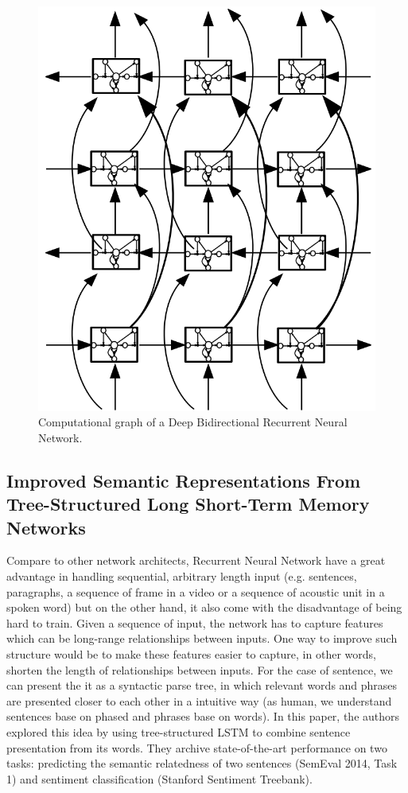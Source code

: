 \begin{figure}[H]
	\centering
	\includegraphics[scale=0.4]{figure/dblstm}
	\caption{Computational graph of a Deep Bidirectional Recurrent Neural Network\cite{GravesLSTM}.}
	\label{fig:dblstm}
\end{figure}

\subsection{Improved Semantic Representations From Tree-Structured Long Short-Term Memory Networks}\label{sec:treelstm}
Compare to other network architects, Recurrent Neural Network have a great advantage in handling sequential, arbitrary length input (e.g. sentences, paragraphs, a sequence of frame in a video or a sequence of acoustic unit in a spoken word) but on the other hand, it also come with the disadvantage of being hard to train\cite{hardRNN}.
Given a sequence of input, the network has to capture features which can be long-range relationships between inputs\cite{socher2013recursive}.
One way to improve such structure would be to make these features easier to capture, in other words, shorten the length of relationships between inputs.
For the case of sentence, we can present the it as a syntactic parse tree, in which relevant words and phrases are presented closer to each other in a intuitive way (as human, we understand sentences base on phased and phrases base on words). 
In this paper\cite{treeLSTM}, the authors explored this idea by using tree-structured LSTM to combine sentence presentation from its words.
They archive state-of-the-art performance on two tasks: predicting the semantic relatedness of two sentences (SemEval 2014, Task 1\cite{SemeEvalTask1}) and sentiment classification (Stanford Sentiment Treebank\cite{socher2013recursive}).


